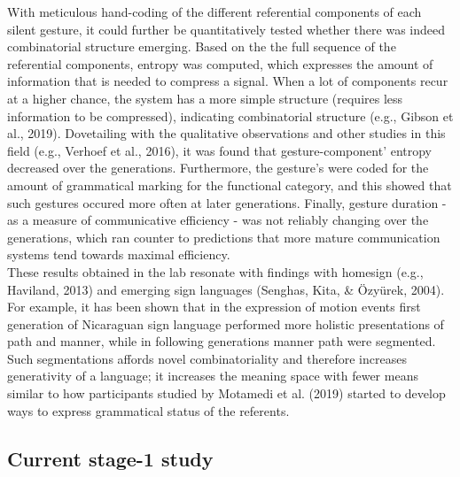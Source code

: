 \documentclass[
  man, noextraspace,floatsintext]{apa6}
\begin{document}
With meticulous hand-coding of the different referential components of each silent gesture, it could further be quantitatively tested whether there was indeed combinatorial structure emerging. Based on the the full sequence of the referential components, entropy was computed, which expresses the amount of information that is needed to compress a signal. When a lot of components recur at a higher chance, the system has a more simple structure (requires less information to be compressed), indicating combinatorial structure (e.g., Gibson et al., 2019). Dovetailing with the qualitative observations and other studies in this field (e.g., Verhoef et al., 2016), it was found that gesture-component' entropy decreased over the generations. Furthermore, the gesture's were coded for the amount of grammatical marking for the functional category, and this showed that such gestures occured more often at later generations. Finally, gesture duration - as a measure of communicative efficiency - was not reliably changing over the generations, which ran counter to predictions that more mature communication systems tend towards maximal efficiency.\\
These results obtained in the lab resonate with findings with homesign (e.g., Haviland, 2013) and emerging sign languages (Senghas, Kita, \& Özyürek, 2004). For example, it has been shown that in the expression of motion events first generation of Nicaraguan sign language performed more holistic presentations of path and manner, while in following generations manner path were segmented. Such segmentations affords novel combinatoriality and therefore increases generativity of a language; it increases the meaning space with fewer means similar to how participants studied by Motamedi et al. (2019) started to develop ways to express grammatical status of the referents.

\hypertarget{current-stage-1-study}{%
\subsection{Current stage-1 study}\label{current-stage-1-study}}
\end{document}
